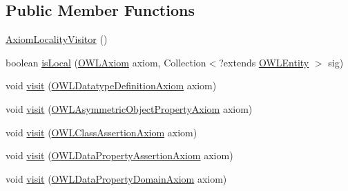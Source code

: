 \subsection*{Public Member Functions}
\begin{DoxyCompactItemize}
\item 
\hyperlink{classcom_1_1clarkparsia_1_1owlapi_1_1modularity_1_1locality_1_1_syntactic_locality_evaluator_1_1_axiom_locality_visitor_a7af923b04c0b3938dcca42fb451e3282}{Axiom\-Locality\-Visitor} ()
\item 
boolean \hyperlink{classcom_1_1clarkparsia_1_1owlapi_1_1modularity_1_1locality_1_1_syntactic_locality_evaluator_1_1_axiom_locality_visitor_a48e8251b7012efb7fde88209a95ae08b}{is\-Local} (\hyperlink{interfaceorg_1_1semanticweb_1_1owlapi_1_1model_1_1_o_w_l_axiom}{O\-W\-L\-Axiom} axiom, Collection$<$?extends \hyperlink{interfaceorg_1_1semanticweb_1_1owlapi_1_1model_1_1_o_w_l_entity}{O\-W\-L\-Entity} $>$ sig)
\item 
void \hyperlink{classcom_1_1clarkparsia_1_1owlapi_1_1modularity_1_1locality_1_1_syntactic_locality_evaluator_1_1_axiom_locality_visitor_a9a0d66af7a191576a27dc575f441461d}{visit} (\hyperlink{interfaceorg_1_1semanticweb_1_1owlapi_1_1model_1_1_o_w_l_datatype_definition_axiom}{O\-W\-L\-Datatype\-Definition\-Axiom} axiom)
\item 
void \hyperlink{classcom_1_1clarkparsia_1_1owlapi_1_1modularity_1_1locality_1_1_syntactic_locality_evaluator_1_1_axiom_locality_visitor_a0b9de3f208db3eb86f7972102c51f453}{visit} (\hyperlink{interfaceorg_1_1semanticweb_1_1owlapi_1_1model_1_1_o_w_l_asymmetric_object_property_axiom}{O\-W\-L\-Asymmetric\-Object\-Property\-Axiom} axiom)
\item 
void \hyperlink{classcom_1_1clarkparsia_1_1owlapi_1_1modularity_1_1locality_1_1_syntactic_locality_evaluator_1_1_axiom_locality_visitor_a3f44280548e42d189b0e95af3e26ef3f}{visit} (\hyperlink{interfaceorg_1_1semanticweb_1_1owlapi_1_1model_1_1_o_w_l_class_assertion_axiom}{O\-W\-L\-Class\-Assertion\-Axiom} axiom)
\item 
void \hyperlink{classcom_1_1clarkparsia_1_1owlapi_1_1modularity_1_1locality_1_1_syntactic_locality_evaluator_1_1_axiom_locality_visitor_a4dc853647c20a8725ff87a7ef0abcca7}{visit} (\hyperlink{interfaceorg_1_1semanticweb_1_1owlapi_1_1model_1_1_o_w_l_data_property_assertion_axiom}{O\-W\-L\-Data\-Property\-Assertion\-Axiom} axiom)
\item 
void \hyperlink{classcom_1_1clarkparsia_1_1owlapi_1_1modularity_1_1locality_1_1_syntactic_locality_evaluator_1_1_axiom_locality_visitor_abb77a0de875698ddc7e6248154a906c8}{visit} (\hyperlink{interfaceorg_1_1semanticweb_1_1owlapi_1_1model_1_1_o_w_l_data_property_domain_axiom}{O\-W\-L\-Data\-Property\-Domain\-Axiom} axiom)

\end{DoxyCompactItemize}
